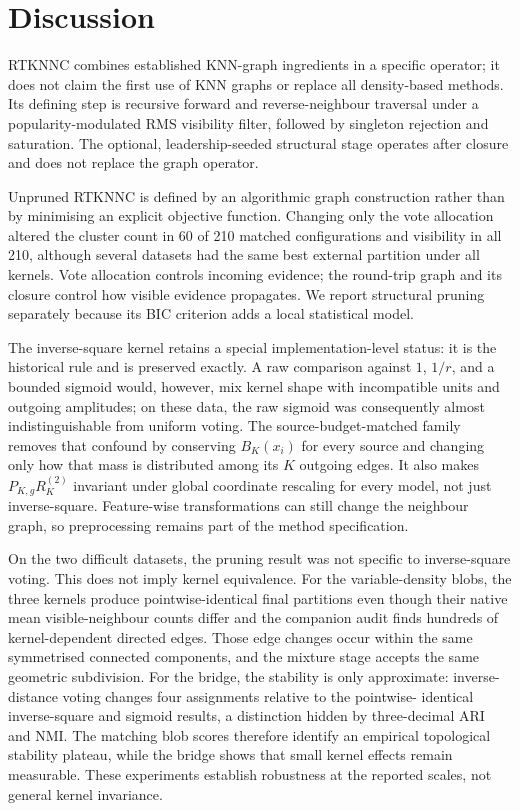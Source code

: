 \documentclass[pdflatex,sn-mathphys-num]{sn-jnl}
\begin{document}
\section{Discussion}\label{sec:discussion}

RTKNNC combines established KNN-graph ingredients in a specific operator; it
does not claim the first use of KNN graphs or replace all density-based methods.
Its defining step is recursive forward and reverse-neighbour traversal under a
popularity-modulated RMS visibility filter, followed by singleton rejection and
saturation. The optional, leadership-seeded structural stage operates after
closure and does not replace the graph operator.

Unpruned RTKNNC is defined by an algorithmic graph construction rather than by
minimising an explicit objective function. Changing only the vote allocation
altered the cluster count in 60 of 210 matched configurations and visibility in
all 210, although several datasets had the same best external partition under
all kernels. Vote allocation controls incoming evidence; the round-trip graph
and its closure control how visible evidence propagates. We report structural
pruning separately because its BIC criterion adds a local statistical model.

The inverse-square kernel retains a special implementation-level status: it is
the historical rule and is preserved exactly.  A raw comparison against $1$,
$1/r$, and a bounded sigmoid would, however, mix kernel shape with incompatible
units and outgoing amplitudes; on these data, the raw sigmoid was consequently
almost indistinguishable from uniform voting.  The source-budget-matched family
removes that confound by conserving $B_K(x_i)$ for every source and changing
only how that mass is distributed among its $K$ outgoing edges.  It also makes
$P_{K,g}R_K^{(2)}$ invariant under global coordinate rescaling for every model,
not just inverse-square.  Feature-wise transformations can still change the
neighbour graph, so preprocessing remains part of the method specification.

On the two difficult datasets, the pruning result was not specific to
inverse-square voting. This does not imply kernel equivalence. For the
variable-density blobs, the three kernels
produce pointwise-identical final partitions even though their native mean
visible-neighbour counts differ and the companion audit finds hundreds of
kernel-dependent directed edges.  Those edge changes occur within the same
symmetrised connected components, and the mixture stage accepts the same
geometric subdivision.  For the bridge, the stability is only approximate:
inverse-distance voting changes four assignments relative to the pointwise-
identical inverse-square and sigmoid results, a distinction hidden by
three-decimal ARI and NMI. The matching blob scores therefore identify an
empirical topological stability plateau, while the bridge shows that small
kernel effects remain measurable. These experiments establish robustness at
the reported scales, not general kernel invariance.
\end{document}
